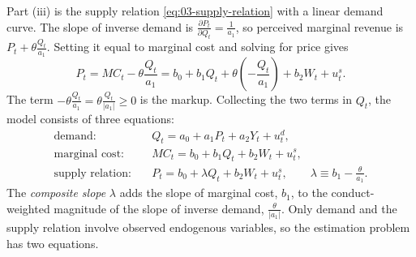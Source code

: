 Part (iii) is the supply relation \eqref{eq:03-supply-relation} with a linear demand curve. The slope of inverse demand
is $\frac{\partial P_t}{\partial Q_t} = \frac{1}{a_1}$, so perceived marginal revenue is $P_t + \theta\frac{Q_t}{a_1}$.
Setting it equal to marginal cost and solving for price gives
\begin{equation*}
P_t = MC_t - \theta\frac{Q_t}{a_1} = b_0 + b_1 Q_t + \theta\left(-\frac{Q_t}{a_1}\right) + b_2 W_t + u^s_t .
\end{equation*}
The term $-\theta\frac{Q_t}{a_1} = \theta\frac{Q_t}{\lvert a_1\rvert} \ge 0$ is the markup. Collecting the two terms in
$Q_t$, the model consists of three equations:
\begin{equation}\label{eq:03-linear-system}
\begin{aligned}
\text{demand:}\quad & Q_t = a_0 + a_1 P_t + a_2 Y_t + u^d_t ,\\
\text{marginal cost:}\quad & MC_t = b_0 + b_1 Q_t + b_2 W_t + u^s_t ,\\
\text{supply relation:}\quad & P_t = b_0 + \lambda Q_t + b_2 W_t + u^s_t, \qquad \lambda \equiv b_1 - \frac{\theta}{a_1} .
\end{aligned}
\end{equation}
The \emph{composite slope} $\lambda$ adds the slope of marginal cost, $b_1$, to the conduct-weighted magnitude of the
slope of inverse demand, $\frac{\theta}{\lvert a_1 \rvert}$. Only demand and the supply relation involve observed
endogenous variables, so the estimation problem has two equations.

